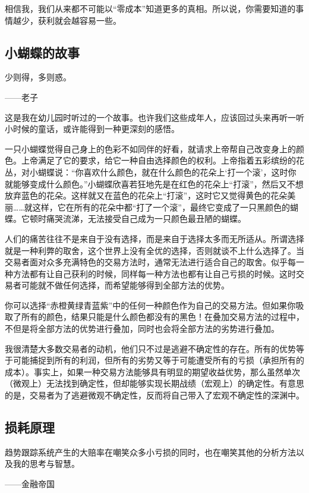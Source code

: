 相信我，我们从来都不可能以“零成本”知道更多的真相。所以说，你需要知道的事情越少，获利就会越容易一些。

\subsection{小蝴蝶的故事}

{\kaishu
少则得，多则惑。

\hfill ——老子
}

这是我在幼儿园时听过的一个故事。也许我们这些成年人，应该回过头来再听一听小时候的童话，或许能得到一种更深刻的感悟。

一只小蝴蝶觉得自己身上的色彩不如同伴的好看，就请求上帝帮自己改变身上的颜色。上帝满足了它的要求，给它一种自由选择颜色的权利。上帝指着五彩缤纷的花丛，对小蝴蝶说：“你喜欢什么颜色，就在什么颜色的花朵上‘打一个滚’，这时你就能够变成什么颜色。”小蝴蝶欣喜若狂地先是在红色的花朵上“打滚”，然后又不想放弃蓝色的花朵。这样就又在蓝色的花朵上“打滚”，这时它又觉得黄色的花朵美丽……就这样，它在所有的花朵中都“打了一个滚”，最终它变成了一只黑颜色的蝴蝶。它顿时痛哭流涕，无法接受自己成为一只颜色最丑陋的蝴蝶。

人们的痛苦往往不是来自于没有选择，而是来自于选择太多而无所适从。所谓选择就是一种利弊的取舍，这个世界上没有全优的选择，否则就谈不上什么选择了。当交易者面对众多充满特色的交易方法时，通常无法进行适合自己的取舍。似乎每一种方法都有让自己获利的时候，同样每一种方法也都有让自己亏损的时候。这时交易者可能就不做任何选择，而希望能够得到全部方法的优势。

你可以选择“赤橙黄绿青蓝紫”中的任何一种颜色作为自己的交易方法。但如果你吸取了所有的颜色，结果只能是什么颜色都没有的黑色！在叠加交易方法的过程中，不但是将全部方法的优势进行叠加，同时也会将全部方法的劣势进行叠加。

我很清楚大多数交易者的动机，他们只不过是逃避不确定性的存在。所有的优势等于可能捕捉到所有的利润，但所有的劣势又等于可能遭受所有的亏损（承担所有的成本）。事实上，如果一种交易方法能够具有明显的期望收益优势，那么虽然单次（微观上）无法找到确定性，但却能够实现长期战绩（宏观上）的确定性。有意思的是，交易者为了逃避微观不确定性，反而将自己带入了宏观不确定性的深渊中。

\subsection{损耗原理}

{\kaishu
趋势跟踪系统产生的大赔率在嘲笑众多小亏损的同时，也在嘲笑其他的分析方法以及我的思考与智慧。

\hfill ——金融帝国
}

